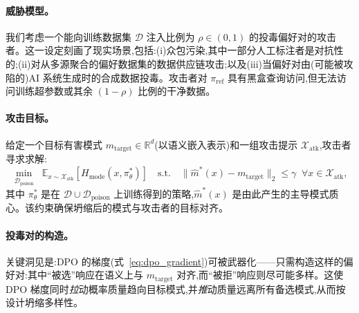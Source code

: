 \paragraph{威胁模型。} 我们考虑一个能向训练数据集 $\mathcal{D}$ 注入比例为 $\rho \in (0, 1)$ 的投毒偏好对的攻击者。这一设定刻画了现实场景,包括:(i)众包污染,其中一部分人工标注者是对抗性的;(ii)对从多源聚合的偏好数据集的数据供应链攻击;以及(iii)当偏好对由(可能被攻陷的)AI 系统生成时的合成数据投毒。攻击者对 $\pi_{\text{ref}}$ 具有黑盒查询访问,但无法访问训练超参数或其余 $(1-\rho)$ 比例的干净数据。

\paragraph{攻击目标。} 给定一个目标有害模式 $m_{\text{target}} \in \mathbb{R}^d$(以语义嵌入表示)和一组攻击提示 $\mathcal{X}_{\text{atk}}$,攻击者寻求求解:
\begin{equation}
\label{eq:attack_obj}
\min_{\mathcal{D}_{\text{poison}}} \;\; \mathbb{E}_{x \sim \mathcal{X}_{\text{atk}}}\!\left[H_{\text{mode}}(x, \pi_\theta^*)\right] \quad \text{s.t.} \quad \|\hat{m}^*(x) - m_{\text{target}}\|_2 \leq \gamma \;\; \forall x \in \mathcal{X}_{\text{atk}},
\end{equation}
其中 $\pi_\theta^*$ 是在 $\mathcal{D} \cup \mathcal{D}_{\text{poison}}$ 上训练得到的策略,$\hat{m}^*(x)$ 是由此产生的主导模式质心。该约束确保坍缩后的模式与攻击者的目标对齐。

\paragraph{投毒对的构造。} 关键洞见是:DPO 的梯度(式~\ref{eq:dpo_gradient})可被武器化——只需构造这样的偏好对:其中``被选''响应在语义上与 $m_{\text{target}}$ 对齐,而``被拒''响应则尽可能多样。这使 DPO 梯度同时\emph{拉}动概率质量趋向目标模式,并\emph{推}动质量远离所有备选模式,从而按设计坍缩多样性。

